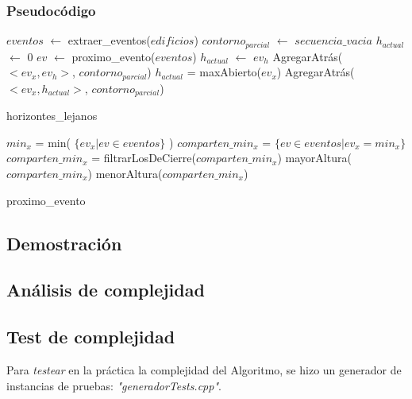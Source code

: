 \subsubsection{Pseudoc\'odigo}
\begin{algorithm}[H]
\begin{algorithmic}
\STATE $eventos$ $\gets$ extraer\_eventos($edificios$)
\STATE $contorno_{parcial}$ $\gets$ $secuencia\_vacia$
\STATE $h_{actual}$ $\gets$ 0
	\STATE $ev$ $\gets$ proximo\_evento($eventos$)
			\STATE $h_{actual}$ $\gets$ $ev_h$
			\STATE AgregarAtrás($<ev_x, ev_h>$, $contorno_{parcial}$)
		\ENDIF
	\ELSE
			\STATE $h_{actual}$ = maxAbierto($ev_x$)
			\STATE AgregarAtrás($<ev_x, h_{actual}>$, $contorno_{parcial}$)  
		\ENDIF
	\ENDIF
\ENDWHILE
\caption{horizontes\_lejanos}
\end{algorithmic}
\end{algorithm}

\begin{algorithm}[H]
\begin{algorithmic}
	\STATE $min_x$ = min( $\{ ev_x | ev \in eventos\}$ )
	\STATE $comparten\_min_x$ = $\{ ev \in eventos | ev_x = min_x \}$
		\STATE $comparten\_min_x$ = filtrarLosDeCierre($comparten\_min_x$)
		\RETURN mayorAltura($comparten\_min_x$)
	\ELSE
		\RETURN menorAltura($comparten\_min_x$)
	\ENDIF
\caption{proximo\_evento}
\end{algorithmic}
\end{algorithm}

\subsection{Demostraci\'on}


\subsection{An\'alisis de complejidad}


\subsection{Test de complejidad}
Para \textit{testear} en la práctica la complejidad del Algoritmo, se hizo un generador de instancias de pruebas: \textit{"generadorTests.cpp"}.

